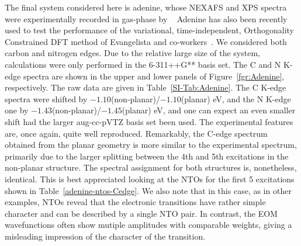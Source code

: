 \documentclass[journal=jctcce,manuscript=article]{achemso}
\begin{document}
\begin{table}[H]
\begin{tabular}{ c | c c c }
    \\
    \hline
\end{tabular}
\end{table}

The final system considered here is adenine, whose NEXAFS and XPS spectra were experimentally recorded in gas-phase by \citeauthor{nexafs_thymine_adenine}~\cite{nexafs_thymine_adenine} 
Adenine has also been recently used to test the performance of the variational, time-independent, Orthogonality Constrained
DFT method of Evangelista and co-workers~\cite{derricotte2015simulation}.
We considered both carbon and nitrogen edges. Due to the relative large size of the system, calculations were only performed in the 6-311++G** basis set. 
The C and N K-edge spectra are shown in the upper and lower panels of Figure~\ref{fgr:Adenine}, respectively. The raw data are given in Table~\ref{SI-Tab:Adenine}.
The C K-edge spectra were shifted by $-1.10$(non-planar)/$-1.10$(planar) eV,
and the N K-edge one by $-1.43$(non-planar)/$-1.45$(planar) eV, 
and one can expect an even smaller shift had the larger aug-cc-pVTZ basis set been used.
The experimental features are, once again, quite well reproduced. Remarkably, the C-edge spectrum obtained from the planar geometry is more similar to the experimental spectrum, primarily due to the larger splitting between the 4th and 5th excitations in the non-planar structure. The spectral assignment for both structures is, nonetheless, identical. This is best appreciated looking at the NTOs for the  first 5 excitations shown in Table~\ref{adenine-ntos-Cedge}.
We also note that in this case, as in other examples, NTOs reveal that the electronic transitions have rather simple character and can be described by a single NTO pair. In contrast, the EOM wavefunctions often show mutiple amplitudes with comparable weights, giving a misleading impression of the character of the transition. 
\end{document}
